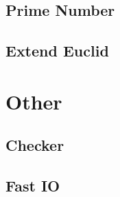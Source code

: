 \documentclass[twoside]{article}
\begin{document}
		\subsection{Prime Number}
			
		\subsection{Extend Euclid}
			
	\newpage
	\section{Other}
		\subsection{Checker}
			
		\subsection{Fast IO}
			
\end{document}
